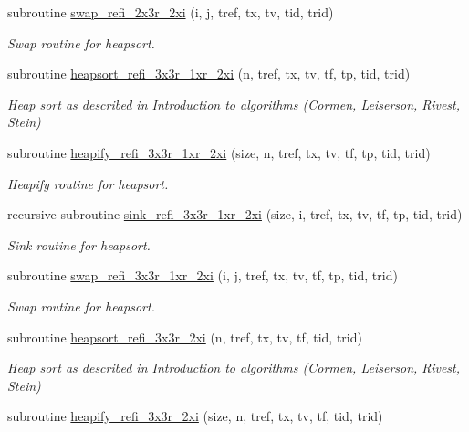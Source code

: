 \begin{DoxyCompactItemize}
subroutine \hyperlink{classmodsortinterf_a77bca8dd76197989bfef55d24632d585}{swap\-\_\-refi\-\_\-2x3r\-\_\-2xi} (i, j, tref, tx, tv, tid, trid)
\begin{DoxyCompactList}\small\item\em Swap routine for heapsort. \end{DoxyCompactList}\item 
subroutine \hyperlink{classmodsortinterf_a3d2a0468246523fb3fc1a3b52551e1b5}{heapsort\-\_\-refi\-\_\-3x3r\-\_\-1xr\-\_\-2xi} (n, tref, tx, tv, tf, tp, tid, trid)
\begin{DoxyCompactList}\small\item\em Heap sort as described in Introduction to algorithms (Cormen, Leiserson, Rivest, Stein) \end{DoxyCompactList}\item 
subroutine \hyperlink{classmodsortinterf_a50f43f9914d9fe6764df84523b847de7}{heapify\-\_\-refi\-\_\-3x3r\-\_\-1xr\-\_\-2xi} (size, n, tref, tx, tv, tf, tp, tid, trid)
\begin{DoxyCompactList}\small\item\em Heapify routine for heapsort. \end{DoxyCompactList}\item 
recursive subroutine \hyperlink{classmodsortinterf_a9a832a4228c68ef37b504198dfcf2e19}{sink\-\_\-refi\-\_\-3x3r\-\_\-1xr\-\_\-2xi} (size, i, tref, tx, tv, tf, tp, tid, trid)
\begin{DoxyCompactList}\small\item\em Sink routine for heapsort. \end{DoxyCompactList}\item 
subroutine \hyperlink{classmodsortinterf_aba91f52e49e92c6236e769a40ee9f194}{swap\-\_\-refi\-\_\-3x3r\-\_\-1xr\-\_\-2xi} (i, j, tref, tx, tv, tf, tp, tid, trid)
\begin{DoxyCompactList}\small\item\em Swap routine for heapsort. \end{DoxyCompactList}\item 
subroutine \hyperlink{classmodsortinterf_ab0689c4b525c7b9a1ef10a4dc3ab05ec}{heapsort\-\_\-refi\-\_\-3x3r\-\_\-2xi} (n, tref, tx, tv, tf, tid, trid)
\begin{DoxyCompactList}\small\item\em Heap sort as described in Introduction to algorithms (Cormen, Leiserson, Rivest, Stein) \end{DoxyCompactList}\item 
subroutine \hyperlink{classmodsortinterf_a0d53f8c755e19db4b6d304709dbe2cc7}{heapify\-\_\-refi\-\_\-3x3r\-\_\-2xi} (size, n, tref, tx, tv, tf, tid, trid)

\end{DoxyCompactItemize}
